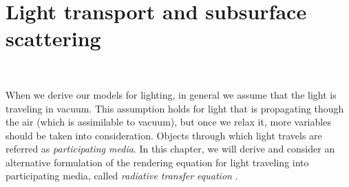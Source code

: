 \section{Light transport and subsurface scattering}
\FloatBarrier
\begin{figure}
\centering
{}
 \\
\label{fig:transport}
\end{figure}

When we derive our models for lighting, in general we assume that the light is traveling in vacuum. This assumption holds for light that is propagating though the air (which is assimilable to vacuum), but once we relax it, more variables should be taken into consideration. Objects through which light travels are referred as \emph{participating media}. In this chapter, we will derive and consider an alternative formulation of the rendering equation for light traveling into participating media, called \emph{radiative transfer equation} \citep{Chandrasekar:1950:RT}.

